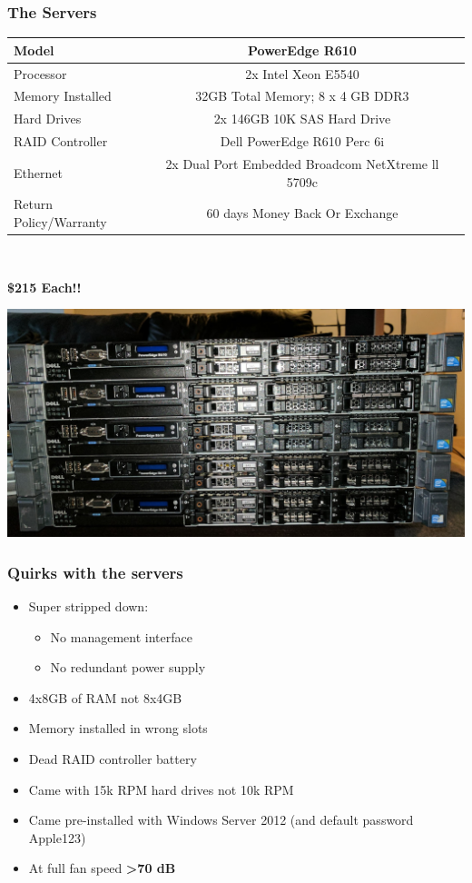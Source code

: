 \documentclass[aspectratio=169,11pt,hyperref={colorlinks=true}]{beamer}
\begin{document}
\begin{frame}
    \frametitle{The Servers}
    \begin{tabular}{ l c r }
        \hline
        Model &	PowerEdge R610 \\
        \hline
        Processor &	2x Intel Xeon E5540 \\
        \hline
        Memory Installed & 32GB Total Memory; 8 x 4 GB DDR3 \\
        \hline
        Hard Drives & 2x 146GB 10K SAS Hard Drive \\
        \hline
        RAID Controller & Dell PowerEdge R610 Perc 6i \\
        \hline
        Ethernet & 2x Dual Port Embedded Broadcom NetXtreme ll 5709c \\
        \hline
        Return Policy/Warranty & 60 days Money Back Or Exchange \\
        \hline
    \end{tabular}
    \\
    \begin{center}
        \Huge{\textbf{\$215 Each!!}}
    \end{center}
\end{frame}

\begin{frame}
    \includegraphics[width=\textwidth]{servers_delivered.jpg}  
\end{frame}

\begin{frame}
    \frametitle{Quirks with the servers}
    \begin{itemize}
        \item Super stripped down:
            \begin{itemize}
                \item No management interface
                \item No redundant power supply
            \end{itemize}
        \item 4x8GB of RAM not 8x4GB
        \item Memory installed in wrong slots
        \item Dead RAID controller battery
        \item Came with 15k RPM hard drives not 10k RPM
        \item Came pre-installed with Windows Server 2012 (and default password Apple123)
        \item At full fan speed \textbf{>70 dB}
    \end{itemize}
\end{frame}
\end{document}
